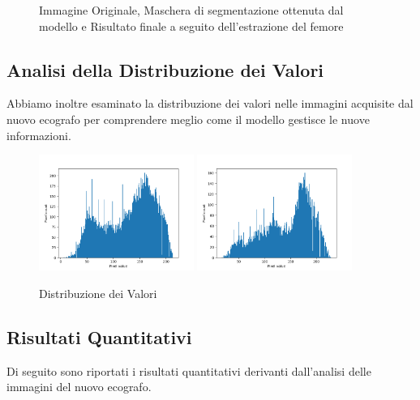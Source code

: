 \begin{figure}[!ht]
\begin{minipage}{0.32\textwidth}
	\end{minipage}
	\caption{Immagine Originale, Maschera di segmentazione ottenuta dal modello e Risultato finale a seguito dell'estrazione del femore}
\end{figure}

\subsection{Analisi della Distribuzione dei Valori}
\label{subsec:analisi_distribuzione_valori}
Abbiamo inoltre esaminato la distribuzione dei valori nelle immagini acquisite dal nuovo ecografo
per comprendere meglio come il modello gestisce le nuove informazioni.

\begin{figure}[!ht]
	\centering
	\includegraphics[width=0.45\textwidth]{./Immagini/nuovo_ecografo_results/hist_0_distribution_value.csv.png}
	\includegraphics[width=0.45\textwidth]{./Immagini/nuovo_ecografo_results/hist_3_distribution_value.csv.png}
	\caption{Distribuzione dei Valori}
	\label{fig:distribuzione_valori}
\end{figure}

\subsection{Risultati Quantitativi}
\label{subsec:risultati_quantitativi}
Di seguito sono riportati i risultati quantitativi derivanti dall'analisi delle immagini del nuovo
ecografo.

